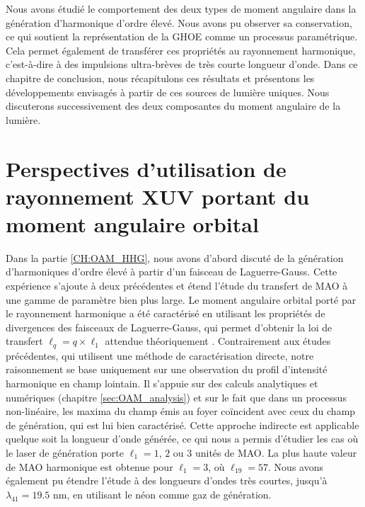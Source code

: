 \makeatletter
\def\toclevel@chapter{-1}
\def\toclevel@section{0}
\def\toclevel@subsection{1}
\makeatother

\renewcommand{\thesection}{\Roman{section}}
\setcounter{section}{0}
\renewcommand*{\theHsection}{CL.\the\value{section}}
\renewcommand{\thefigure}{\Roman{section}.\arabic{figure}}
\setcounter{figure}{0}



Nous avons étudié le comportement des deux types de moment angulaire dans la génération d'harmonique d'ordre élevé. Nous avons pu observer sa conservation, ce qui soutient la représentation de la GHOE comme un processus paramétrique. Cela permet également de transférer ces propriétés au rayonnement harmonique, c'est-à-dire à des impulsions ultra-brèves de très courte longueur d'onde. Dans ce chapitre de conclusion, nous récapitulons ces résultats et présentons les développements envisagés à partir de ces sources de lumière uniques. Nous discuterons successivement des deux composantes du moment angulaire de la lumière.

\section{Perspectives d'utilisation de rayonnement XUV portant du moment angulaire orbital}
Dans la partie \ref{CH:OAM_HHG}, nous avons d'abord discuté de la génération d'harmoniques d'ordre élevé à partir d'un faisceau de Laguerre-Gauss. Cette expérience s'ajoute à deux précédentes  et étend l'étude du transfert de MAO à une gamme de paramètre bien plus large. Le moment angulaire orbital porté par le rayonnement harmonique a été caractérisé en utilisant les propriétés de divergences des faisceaux de Laguerre-Gauss, qui permet d'obtenir la loi de transfert $\ell_q=q\times\ell_1$ attendue théoriquement . Contrairement aux études précédentes, qui utilisent une méthode de caractérisation directe, notre raisonnement se base uniquement sur une observation du profil d'intensité harmonique en champ lointain. Il s'appuie sur des calculs analytiques et numériques (chapitre \ref{sec:OAM_analysis}) et sur le fait que dans un processus non-linéaire, les maxima du champ émis au foyer coïncident avec ceux du champ de génération, qui est lui bien caractérisé. Cette approche indirecte est applicable quelque soit la longueur d'onde générée, ce qui nous a permis d'étudier les cas où le laser de génération porte $\ell_1=1$, $2$ ou $3$ unités de MAO. La plus haute valeur de MAO harmonique est obtenue pour $\ell_1=3$, où $\ell_{19} = 57$. Nous avons également pu étendre l'étude à des longueurs d'ondes très courtes, jusqu'à $\lambda_{41} = 19.5$ nm, en utilisant le néon comme gaz de génération.

